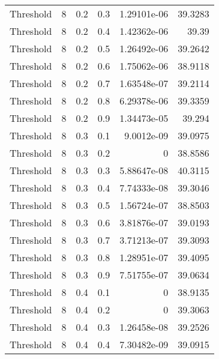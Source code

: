 \documentclass{article}
\begin{document}
\begin{longtable}[H]{lrrrrr}
 Threshold      &       8 &   0.2 &            0.3 &      1.29101e-06 &         39.3283 \\
 Threshold      &       8 &   0.2 &            0.4 &      1.42362e-06 &         39.39   \\
 Threshold      &       8 &   0.2 &            0.5 &      1.26492e-06 &         39.2642 \\
 Threshold      &       8 &   0.2 &            0.6 &      1.75062e-06 &         38.9118 \\
 Threshold      &       8 &   0.2 &            0.7 &      1.63548e-07 &         39.2114 \\
 Threshold      &       8 &   0.2 &            0.8 &      6.29378e-06 &         39.3359 \\
 Threshold      &       8 &   0.2 &            0.9 &      1.34473e-05 &         39.294  \\
 Threshold      &       8 &   0.3 &            0.1 &      9.0012e-09  &         39.0975 \\
 Threshold      &       8 &   0.3 &            0.2 &      0           &         38.8586 \\
 Threshold      &       8 &   0.3 &            0.3 &      5.88647e-08 &         40.3115 \\
 Threshold      &       8 &   0.3 &            0.4 &      7.74333e-08 &         39.3046 \\
 Threshold      &       8 &   0.3 &            0.5 &      1.56724e-07 &         38.8503 \\
 Threshold      &       8 &   0.3 &            0.6 &      3.81876e-07 &         39.0193 \\
 Threshold      &       8 &   0.3 &            0.7 &      3.71213e-07 &         39.3093 \\
 Threshold      &       8 &   0.3 &            0.8 &      1.28951e-07 &         39.4095 \\
 Threshold      &       8 &   0.3 &            0.9 &      7.51755e-07 &         39.0634 \\
 Threshold      &       8 &   0.4 &            0.1 &      0           &         38.9135 \\
 Threshold      &       8 &   0.4 &            0.2 &      0           &         39.3063 \\
 Threshold      &       8 &   0.4 &            0.3 &      1.26458e-08 &         39.2526 \\
 Threshold      &       8 &   0.4 &            0.4 &      7.30482e-09 &         39.0915 \\

\end{longtable}
\end{document}
